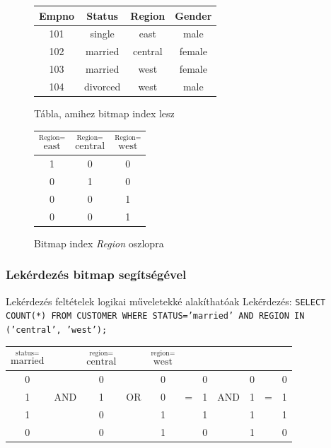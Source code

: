 \documentclass[12pt,a4paper]{article}
\begin{document}
\begin{figure}[h!]
	\centering
	\begin{minipage}{0.5\textwidth}
		\centering
		\begin{tabular}{|c|c|c|c|}
			\hline
			\textbf{Empno} & \textbf{Status} & \textbf{Region} & \textbf{Gender} \\
			\hline
			101 & single & east & male \\
			\hline
			102 & married & central & female \\
			\hline
			103 & married & west & female \\
			\hline
			104 & divorced & west & male \\
			\hline
		\end{tabular}
		\captionsetup{labelformat=empty}
		\caption{Tábla, amihez bitmap index lesz}
	\end{minipage}%
	\begin{minipage}{0.5\textwidth}
		\centering
		\begin{tabular}{|c|c|c|}
			\hline
			$\stackrel{\text{Region=}}{\text{east}}$ & $\stackrel{\text{Region=}}{\text{central}}$ & $\stackrel{\text{Region=}}{\text{west}}$ \\
			\hline
			1 & 0 & 0 \\
			\hline
			0 & 1 & 0 \\
			\hline
			0 & 0 & 1 \\
			\hline
			0 & 0 & 1 \\
			\hline
		\end{tabular}
		\captionsetup{labelformat=empty}
		\caption{Bitmap index \textit{Region} oszlopra}
	\end{minipage}
\end{figure}

\subsubsection{Lekérdezés bitmap segítségével}

\begin{outline}
	\1 Lekérdezés feltételek logikai műveletekké alakíthatóak
	\1 Lekérdezés: \texttt{SELECT COUNT(*) FROM CUSTOMER WHERE STATUS='married' AND REGION IN ('central', 'west');}
\end{outline}

\begin{table}[h!]
	\centering
	\begin{tabular}{|c|c|c|c|c|c|c|c|c|c|c|}
		\hline
		$\stackrel{\text{status=}}{\text{married}}$ &  &
		$\stackrel{\text{region=}}{\text{central}}$ &  &
		$\stackrel{\text{region=}}{\text{west}}$ &  &  &  &  &  &  \\
		\hline
		0 &     & 0 &    & 0 &   & 0 &     & 0 &   & 0 \\
		\hline
		1 & AND & 1 & OR & 0 & = & 1 & AND & 1 & = & 1 \\
		\hline
		1 &     & 0 &    & 1 &   & 1 &     & 1 &   & 1 \\
		\hline
		0 &     & 0 &    & 1 &   & 0 &     & 1 &   & 0 \\
		\hline
	\end{tabular}
\end{table}
\end{document}
